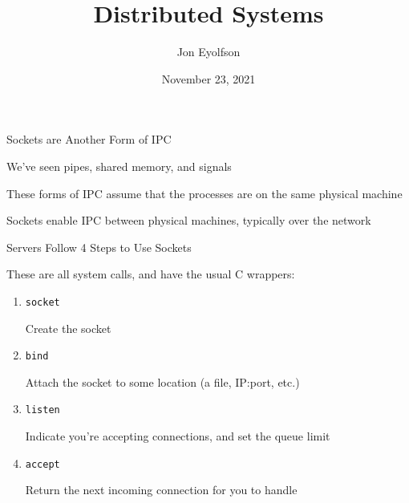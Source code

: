 

\title{Distributed Systems}
\author{Jon Eyolfson}
\date{November 23, 2021}


  \begin{frame}
    \titlepage
  \end{frame}

  \begin{frame}{Sockets are Another Form of IPC}

    We've seen pipes, shared memory, and signals

    \vspace{2em}

    These forms of IPC assume that the processes are on the same physical
    machine

    \vspace{2em}

    Sockets enable IPC between physical machines, typically over the network
  \end{frame}

  \begin{frame}{Servers Follow 4 Steps to Use Sockets}

    These are all system calls, and have the usual C wrappers:

    \vspace{2em}

    \begin{enumerate}
      \item \texttt{socket}

        \hspace{2em} Create the socket
      \item \texttt{bind}

        \hspace{2em} Attach the socket to some location (a file, IP:port, etc.)
      \item \texttt{listen}

        \hspace{2em} Indicate you're accepting connections, and set the queue limit
      \item \texttt{accept}

        \hspace{2em} Return the next incoming connection for you to handle
    \end{enumerate}
  \end{frame}

